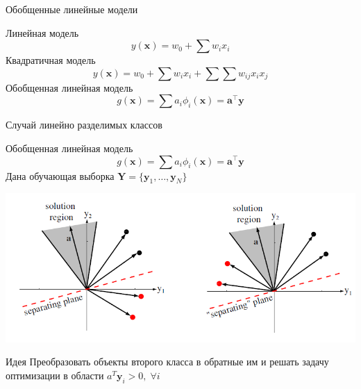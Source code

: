 \documentclass[10pt]{beamer}
\begin{document}

\begin{frame}{Обобщенные линейные модели}

Линейная модель
\[
y(\mathbf{x}) = w_0 + \sum w_i x_i
\]
Квадратичная модель
\[
y(\mathbf{x}) = w_0 + \sum w_i x_i + \sum \sum w_{ij} x_i x_j
\]
Обобщенная линейная модель
\[
g(\mathbf{x}) = \sum a_i \phi_i(\mathbf{x}) = \mathbf{a}^\top \mathbf{y}
\]

\end{frame}


\begin{frame}{Случай линейно разделимых классов}

Обобщенная линейная модель
\[
g(\mathbf{x}) = \sum a_i \phi_i(\mathbf{x}) = \mathbf{a}^\top \mathbf{y}
\]
Дана обучающая выборка $\mathbf{Y} = \{\mathbf{y}_1, \ldots, \mathbf{y}_N\}$

\begin{center}
\includegraphics[scale=0.35]{images/optimzation.png}
\end{center}

\begin{exampleblock}{Идея}
Преобразовать объекты второго класса в обратные им и решать задачу оптимизации в области $a^T \mathbf{y}_i > 0, \; \forall i$
\end{exampleblock}

\end{frame}

\end{document}
